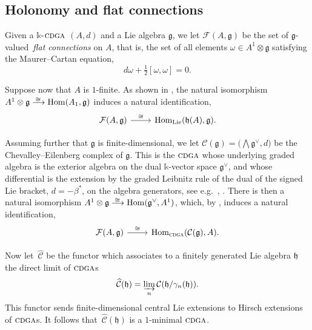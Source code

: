 \documentclass{article}
\numberwithin{equation}{section}
\theoremstyle{definition}
\renewcommand{\k}{\mathbb{k}}
\newcommand{\cC}{\mathcal{C}}
\newcommand{\F}{\mathcal{F}}
\newcommand{\wC}{\,\widehat{\mathcal{\!C}}}
\newcommand{\g}{{\mathfrak{g}}}
\newcommand{\h}{{\mathfrak{h}}}
\newcommand{\cdga}{\ensuremath{\textsc{cdga}}}
\DeclareMathOperator{\Hom}{{Hom}}
\DeclareMathOperator{\Lie}{Lie}
\newcommand{\isom}{\xrightarrow{
   \,\smash{\raisebox{-0.4ex}{\ensuremath{\scriptstyle\cong}}}\,}}
\begin{document}
\subsection{Holonomy and flat connections}
\label{subsec:holflat}

Given a $\k$-$\cdga$ $(A,d)$ and a Lie algebra $\g$, we 
let $\F(A, \g)$ be the set of $\g$-valued\, {\em flat connections}\/ on $A$,    
that is, the set of all elements $\omega \in A^1\otimes \g$ satisfying the
Maurer--Cartan equation,
\begin{equation}
\label{eq:mc}
d\omega + \tfrac{1}{2}[\omega, \omega]=0  .
\end{equation}

Suppose now that $A$ is $1$-finite. As shown in \cite{MPPS}, 
the natural isomorphism $A^1\otimes \g \isom \Hom (A_1, \g)$ 
induces a natural identification,
%
\begin{equation}
\label{eq:flathol}
\begin{tikzcd}
\F(A, \g) \ar[r, "\cong"] & \Hom_{\Lie} (\h (A), \g)  .
\end{tikzcd}
\end{equation}

Assuming further that $\g$ is finite-dimensional, we let 
$\cC(\g)=\big(\bigwedge \g^{\vee}, d)$ be the Cheval\-ley--Eilenberg 
complex of $\g$. This is the $\cdga$ whose underlying graded 
algebra is the exterior algebra on the dual $\k$-vector space 
$\g^{\vee}$, and whose differential  is the extension by the 
graded Leibnitz rule of the dual of the signed Lie bracket, 
$d=-\beta^*$, on the algebra generators, 
see e.g.~\cite{HS79}, \cite{FHT}.  There is then a natural isomorphism 
$A^1\otimes \g \isom \Hom (\g^{\vee}, A^1)$, which, 
by \cite[Lemma 3.4]{DP-ccm}, induces a natural identification,
%
\begin{equation}
\label{eq:flatcochains}
\begin{tikzcd}
\F(A, \g) \ar[r, "\cong"] &\Hom_{\cdga} (\cC (\g), A) .
\end{tikzcd}
\end{equation}

Now let $\wC$ be the functor which associates to a finitely generated 
Lie algebra $\h$ the direct limit of $\cdga$s 
\begin{equation}
\label{eq:chat}
\wC (\h)= \varinjlim_n \cC (\h/\gamma_n(\h)).
\end{equation}
This functor sends finite-dimensional central 
Lie extensions to Hirsch extensions of $\cdga$s.
It follows that $\wC (\h)$ is a $1$-minimal $\cdga$.
\end{document}
